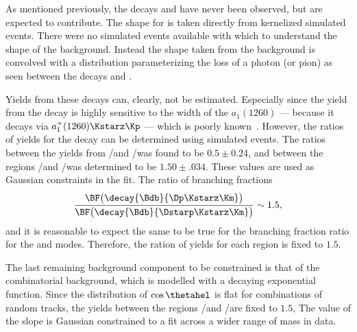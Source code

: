 As mentioned previously, the decays \bstodskstrk and \bstodsstrkstrk have never been observed, but
are expected to contribute.
The shape for \bstodskstrk is taken directly from kernelized simulated events.
There were no simulated events available with which to understand the shape of the \bstodsstrkstrk
background.
Instead the shape taken from the \bstodskstrk background is convolved with a distribution
parameterizing the loss of a photon (or pion) as seen between the decays \btodsstrphi and
\bstodskstrk.


Yields from these decays can, clearly, not be estimated.
Especially since the yield from the decay \bstodskstrk is highly sensitive to the width of the
$a_1(1260)$ --- because it decays via $a_1^+(1260)\Kstarz\Kp$ --- which is poorly known~\cite{PDG2012}.
However, the ratios of yields for the \bstodskstrk decay can be determined using simulated events.
The ratios between the yields from \rA/\rB and \rC/\rD was found to be $0.5\pm0.24$, and between the
regions \rA/\rC and \rB/\rD was determined to be $1.50\pm.034$.
These values are used as Gaussian constraints in the fit.
The ratio of branching fractions
\begin{equation}
  \frac{\BF\big(\decay{\Bdb}{\Dp\Kstarz\Km}\big)}
  {\BF\big(\decay{\Bdb}{\Dstarp\Kstarz\Km}\big)}
  \sim 1.5,
\end{equation}
and it is reasonable to expect the same to be true for the branching fraction ratio for the
\bstodskstrk and \bstodsstrkstrk modes.
Therefore, the ration of yields for each region is fixed to $1.5$.



The last remaining background component to be constrained is that of the combinatorial background,
which is modelled with a decaying exponential function.
Since the distribution of $\cos\thetahel$ is flat for combinations of random tracks, the yields
between the regions \rA/\rC and \rB/\rD  are fixed to $1.5$,
The value of the slope is Gaussian constrained to a fit across a wider range of mass in data.

